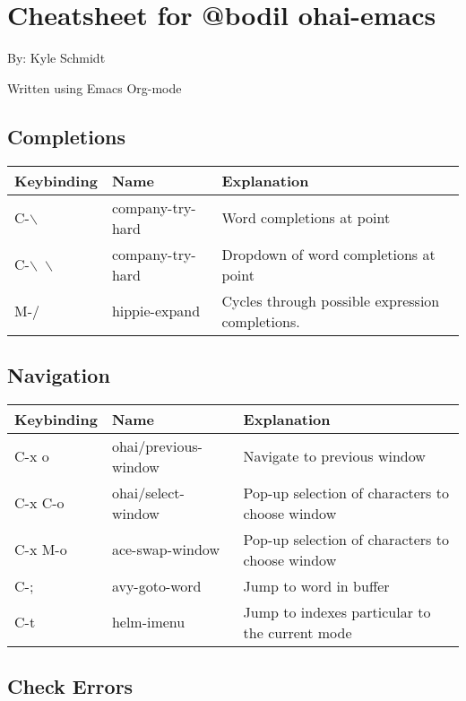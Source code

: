 \documentclass[11pt]{article}
\author{Kyle Schmidt}
\date{\today}
\title{}
\begin{document}
\tableofcontents

\section{Cheatsheet for @bodil ohai-emacs}
\label{sec:orgheadline5}
By: Kyle Schmidt

Written using Emacs Org-mode

\subsection{Completions}
\label{sec:orgheadline1}

\begin{center}
\begin{tabular}{lll}
Keybinding & Name & Explanation\\
\hline
C-$\backslash$\ & company-try-hard & Word completions at point\\
C-$\backslash$\ $\backslash$\ & company-try-hard & Dropdown of word completions at point\\
M-/ & hippie-expand & Cycles through possible expression completions.\\
\end{tabular}
\end{center}

\subsection{Navigation}
\label{sec:orgheadline2}

\begin{center}
\begin{tabular}{lll}
Keybinding & Name & Explanation\\
\hline
C-x o & ohai/previous-window & Navigate to previous window\\
C-x C-o & ohai/select-window & Pop-up selection of characters to choose window\\
C-x M-o & ace-swap-window & Pop-up selection of characters to choose window\\
C-; & avy-goto-word & Jump to word in buffer\\
C-t & helm-imenu & Jump to indexes particular to the current mode\\
\end{tabular}
\end{center}

\subsection{Check Errors}
\label{sec:orgheadline3}
\end{document}
